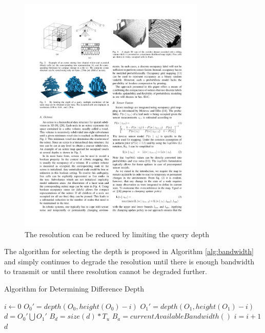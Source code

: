 \documentclass[journal]{IEEEtran}
\begin{document}
  \begin{figure}[here]
    \centering
    \includegraphics[width=3.5in,keepaspectratio]{treedepth.pdf}
    \caption{The resolution can be reduced by limiting the query 
             depth\cite{octomap}}
    \label{fig:treedepth}
  \end{figure}
  
  The algorithm for selecting the depth is proposed in Algorithm
  \ref{alg:bandwidth} and simply continues to degrade the resolution until
  there is enough bandwidth to transmit or until there resolution cannot be
  degraded further.
  
  \begin{algorithm}
  \caption{Algorithm for Determining Difference Depth}
  \label{alg:treedepth}
  \begin{algorithmic}
    \STATE {}
    \STATE {}
    \STATE {}
    \STATE {}
    \STATE {}
    \STATE {}
    \STATE $i\gets 0$
    \REPEAT
      \STATE $O_0 \prime = depth(O_0,height(O_0)-i)$
      \STATE $O_1 \prime = depth(O_1,height(O_1)-i)$
      \STATE $d = O_0 \prime \bigcup O_1 \prime $
      \STATE $B_d = size(d) * T_u$
      \STATE $B_a = currentAvailableBandwidth()$
      \STATE $i = i + 1$
    \RETURN $d$
  \end{algorithmic}
  \end{algorithm}
  
\end{document}
